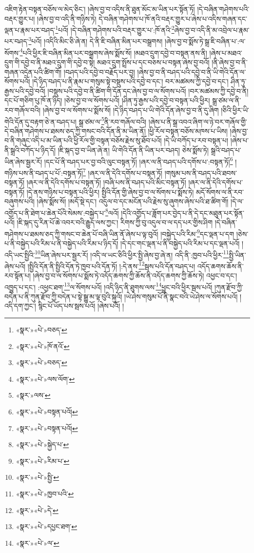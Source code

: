 འཇིག་རྟེན་བསྟན་བཅོས་ལ་མེད་ཅིང་། །ཞེས་བྱ་བ་འདིས་ནི་ཐུན་མོང་མ་ཡིན་པར་སྟོན་ཏོ། །དེ་བཞིན་གཤེགས་པའི་བརྡར་གྱུར་པ། །ཞེས་བྱ་བ་འདི་ནི་གཉིས་ཏེ། དེ་བཞིན་གཤེགས་པ་ཁོ་ནའི་བརྡར་གྱུར་པ་ཞེས་པ་འདིས་གཞན་དང་ལྡན་པ་རྣམ་པར་བཤད་\footnote{«སྣར་»«པེ་»བཅད་}པའོ། །དེ་བཞིན་གཤེགས་པའི་བརྡར་གྱུར་པ་:ཁོ་ནའི་\footnote{«སྣར་»«པེ་»ཁོ་ནའོ་}ཞེས་བྱ་བ་འདི་ནི་མ་འབྲེལ་པ་རྣམ་པར་བཤད་\footnote{«སྣར་»«པེ་»བཅད་}པའོ། །འདིའི་མིང་ཅི་ཞེ་ན། དེ་ནི་ཇི་བཞིན་མིན་པར་བསྒྲགས། །ཞེས་བྱ་བ་སྨོས་ཏེ་སྒྲ་ཇི་བཞིན་པ་:ལ་སོགས་\footnote{«སྣར་»«པེ་»ལས་ལོག་}པའི་ཕྱིར་ཇི་བཞིན་མིན་པར་བསྒྲགས་ཞེས་སྨོས་སོ། །མཐའ་དྲུག་དབྱེ་བ་བསྟན་ནས་ནི། །ཞེས་པ་མཐའ་དྲུག་གི་དབྱེ་བ་ནི་མཐའ་དྲུག་གི་དབྱེ་བ་སྟེ། མཐའ་དྲུག་སྤྲོས་པ་དང་བཅས་པ་བསྟན་ཞེས་བྱ་བའོ། །ནི་ཞེས་བྱ་བ་ནི་གཞན་འདྲེན་པའི་ཚིག་གོ། །བཤད་པའི་དབྱེ་བ་བརྗོད་པར་བྱ། །ཞེས་བྱ་བ་ནི་བཤད་པའི་དབྱེ་བ་ནི་ཡི་གེའི་དོན་ལ་སོགས་པའོ། །དེ་ཉིད་བཤད་པ་ནི་རྣམ་པ་གསུམ་སྟེ་བསྡུས་པའི་དབྱེ་བ་དང་། བར་མཚམས་ཀྱི་དབྱེ་བ་དང་། ཤིན་ཏུ་རྒྱས་པའི་དབྱེ་བའོ། །བསྡུས་པའི་དབྱེ་བ་ནི་ཚིག་གི་དོན་དང་ཞེས་བྱ་བ་ལ་སོགས་པའོ། །བར་མཚམས་ཀྱི་དབྱེ་བ་ནི། དང་པོ་གཅིག་པུ་ཁོ་ན་ཉིད། །ཅེས་བྱ་བ་ལ་སོགས་པའོ། །ཤིན་ཏུ་རྒྱས་པའི་དབྱེ་བ་བསྟན་པའི་ཕྱིར། སྒྲ་ཙམ་ལ་ནི་རབ་གཞོལ་བའི། །ཞེས་བྱ་བ་ལ་སོགས་པ་སྨོས་སོ། །དེ་ཉིད་བཤད་པ་ཡི་གེའི་དོན་ཞེས་བྱ་བ་ནི་དུ་ཞིག །ཅིའི་ཕྱིར་ཡི་གེའི་དོན་དུ་བརྟག་ཅེ་ན་བཤད་པ། སྒྲ་ཙམ་ལ་\footnote{«སྣར་»ལས་}ནི་རབ་གཞོལ་བའི། །ཞེས་པ་ནི་སྒྲ་འབའ་ཞིག་ལ་ཉེ་བར་གཞོལ་གྱི་དེ་བཞིན་གཤེགས་པ་ཐམས་ཅད་ཀྱི་གསང་བའི་དོན་ནི་མ་ཡིན་ནོ། །ཕྱི་རོལ་བསྟན་བཅོས་མཁས་པ་ཡིས། །ཞེས་བྱ་བ་ནི་གཞུང་འདི་པ་མ་ཡིན་པའི་ཕྱི་རོལ་གྱི་བསྟན་བཅོས་རྗེས་སུ་ཐོབ་པའོ། །དེ་ཡི་བཀོད་པ་རབ་བསྟན་པ། །ཞེས་པ་ནི་སྒྲའི་བཀོད་པ་ཉིད་དོ། །ཇི་སྐད་བྱ་བ་ཡིན་ཞེ་ན། ཡི་གེའི་དོན་ནི་ཡིན་པར་བཤད། ཅེས་སྨོས་ཏེ། སྒྲའི་བཤད་པ་ཡིན་ཞེས་སྦྱར་རོ། །དང་པོ་ནི་བཤད་པར་བྱ་བའི་ལུང་བསྟན་ཏོ། །ཞར་ལ་ནི་བཤད་པའི་དགོས་པ་:བསྟན་ཏོ།\footnote{«སྣར་»«པེ་»བསྟན་པའོ།} །གཉིས་པས་ནི་བཤད་པ་པོ་:བསྟན་ཏོ།\footnote{«སྣར་»«པེ་»བསྟན་པའོ།} །ཞར་ལ་ནི་དེའི་དགོས་པ་བསྟན་ཏོ། །གསུམ་པས་ནི་བཤད་པའི་ཐབས་བསྟན་ཏོ། །ཞར་ལ་ནི་དེའི་དགོས་པ་བསྟན་ཏོ། །བཞི་པས་ནི་བཤད་པའི་མིང་བསྟན་ཏོ། །ཞར་ལ་ནི་དེའི་དགོས་པ་བསྟན་ཏོ། །དེ་ནས་གཉིས་པ་བསྟན་པའི་ཕྱིར། སྤྱིའི་དོན་གྱི་ཞེས་བྱ་བ་ལ་སོགས་པ་སྨོས་ཏེ། མདོ་སོགས་ལ་ནི་རབ་བཞུགས་པའི། །ཞེས་སྨོས་སོ། །མདོ་སྡེ་དང་། འདུལ་བ་དང་མངོན་པའི་རྗེས་སུ་ཞུགས་ཞེས་པའི་ཐ་ཚིག་གོ། །དེ་ལ་འགྱོད་པ་ནི་ཐེག་པ་ཆེན་པོའི་སེམས་:བསྐྱེད་པ་\footnote{«སྣར་»«པེ་»སྐྱེད་པ་}ལའོ། །དེའི་འགྱོད་པ་ཟློག་པར་བྱེད་པ་ནི་དེ་དང་མཐུན་པར་སྟོན་པའོ། །ཇི་སྐད་དུ་རིན་པོ་ཆེ་འབར་བའི་རྒྱུད་ལས་ཀྱང་། རིགས་ཀྱི་བུ་འདུལ་བ་ལ་དད་པར་གྱིས་ཤིག །དེ་བཞིན་གཤེགས་པ་ཐམས་ཅད་ཀྱི་གསང་བ་ཆེན་པོ་བཞི་ཡིན་ནོ་ཞེས་པ་ལྟ་བུའོ། །བསྐྱེད་པའི་རིམ་\footnote{«སྣར་»«པེ་»རིམ་པ་}དང་ལྡན་པ་དག །ཅེས་པ་ནི་བསྐྱེད་པའི་རིམ་པ་ནི་བསྐྱེད་པའི་རིམ་པ་ཉིད་དོ། །དེ་དང་གང་ལྡན་པ་ནི་བསྐྱེད་པའི་རིམ་པ་དང་ལྡན་པའོ། །འདི་ཡང་སྤྱིའི་\footnote{«སྣར་»«པེ་»སྤྱི་}ཡིན་ཞེས་པར་སྦྱར་རོ། །འདི་ལ་ཡང་ཅིའི་ཕྱིར་སྤྱི་ཞེས་བྱ་ཞེ་ན། འདི་ནི་:ཁྱབ་པའི་ཕྱིར་\footnote{«སྣར་»«པེ་»ཁྱབ་པའི་}སྤྱི་ཡིན་ཞེས་པའོ། །སྤྱིའི་དོན་ནི་སྤྱིའི་དོན་ཏེ་ཁྱབ་པའི་དོན་ཏོ། །:དེ་ནས་\footnote{«སྣར་»«པེ་»དེ་}སྦས་པའི་དོན་བཤད་པ། འདོད་ཆགས་ཆོས་ནི་རབ་སྟོན་པ། །ཞེས་བྱ་བ་ལ་སོགས་པ་སྨོས་ཏེ་འདོད་ཆགས་ཀྱི་ཆོས་ནི་འདོད་ཆགས་ཀྱི་ཆོས་ཏེ། འཕྱང་བ་དང་། འཁྱུད་པ་དང་། :འཕྱང་ཐག་\footnote{«སྣར་»«པེ་»དཔྱང་ཐག་}ལ་སོགས་པའོ། །འདི་ཉིད་ནི་ཐུགས་ལས་\footnote{«སྣར་»«པེ་»ལ་}ཕྱུང་བའི་ཕྱིར་སྦས་པའོ། །ཀུན་རྫོབ་ཀྱི་བདེན་པ་ནི་ཀུན་རྫོབ་ཀྱི་བདེན་པ་སྟེ་སྒྱུ་མ་ལྟ་བུའི་སྐུའོ། །ཡེ་ཤེས་གསུམ་པོ་ནི་སྣང་བའི་ཡེ་ཤེས་ལ་སོགས་པའོ། །འདི་དག་ཀྱང་། སྙིང་པོ་ཡོད་པས་སྦས་པའོ། །ཞེས་པའོ། །
